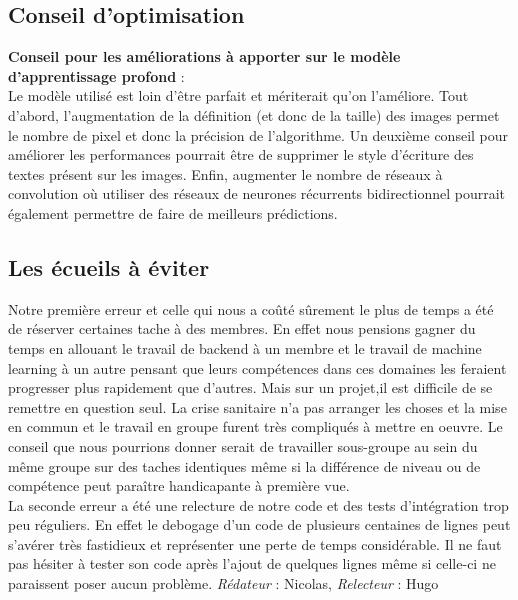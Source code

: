\documentclass[oneside,a4paper,13pt]{article}
\begin{document}
\subsection{Conseil d'optimisation}
\textbf{Conseil pour les améliorations à apporter sur le modèle d'apprentissage profond} : \\
Le modèle utilisé est loin d'être parfait et mériterait qu'on l'améliore. Tout d'abord, l'augmentation de la définition (et donc de la taille) des images permet le nombre de pixel et donc la précision de l'algorithme. Un deuxième conseil pour améliorer les performances pourrait être de supprimer le style d'écriture des textes présent sur les images. Enfin, augmenter le nombre de réseaux à convolution où utiliser des réseaux de neurones récurrents bidirectionnel pourrait également permettre de faire de meilleurs prédictions.

\subsection{Les écueils à éviter}
Notre première erreur et celle qui nous a coûté sûrement le plus de temps a été de réserver certaines tache à des membres. En effet nous pensions gagner du temps en allouant le travail de backend à un membre et le travail de machine learning à un autre pensant que leurs compétences dans ces domaines les feraient progresser plus rapidement que d'autres. Mais sur un projet,il est difficile de se remettre en question seul. La crise sanitaire n'a pas arranger les choses et la mise en commun et le travail en groupe furent très compliqués à mettre en oeuvre. Le conseil que nous pourrions donner serait de travailler sous-groupe au sein du même groupe sur des taches identiques même si la différence de niveau ou de compétence peut paraître handicapante à première vue.\\
La seconde erreur a été une relecture de notre code et des tests d'intégration trop peu réguliers. En effet le debogage d'un code de plusieurs centaines de lignes peut s'avérer très fastidieux et représenter une perte de temps considérable. Il ne faut pas hésiter à tester son code après l'ajout de quelques lignes même si celle-ci ne paraissent poser aucun problème.
\smallbreak\textit{Rédateur} : Nicolas, \textit{Relecteur} : Hugo
\end{document}
